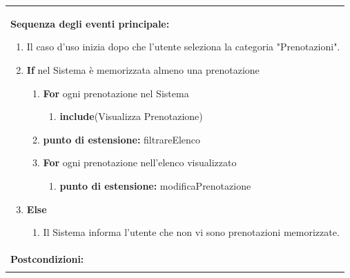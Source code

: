 \documentclass{article}
\begin{document}
\begin{table}[H]
\begin{tabular}{|p{\linewidth}|}
\begin{minipage}{\linewidth}
                        \end{minipage}
                        \vspace{0pt} \\
                        \hline
                        \textbf{Sequenza degli eventi principale:}
                        \begin{enumerate}
                            \item Il caso d'uso inizia dopo che l'utente seleziona la categoria "Prenotazioni".
                            \item \textbf{If} nel Sistema è memorizzata almeno una prenotazione
                            \begin{enumerate}
                                \item \textbf{For} ogni prenotazione nel Sistema
                                \begin{enumerate}
                                    \item \textbf{include}(Visualizza Prenotazione)
                                \end{enumerate}
                                \item[] \textbf{punto di estensione:} filtrareElenco
                                \item \textbf{For} ogni prenotazione nell'elenco visualizzato
                                \begin{enumerate}
                                    \item[] \textbf{punto di estensione:} modificaPrenotazione %
                                \end{enumerate}
                            \end{enumerate}
                            \item \textbf{Else}
                            \begin{enumerate}
                                \item Il Sistema informa l'utente che non vi sono prenotazioni memorizzate.
                            \end{enumerate}
                        \end{enumerate} \\
                        \hline
                        \cellcolor{gray!20}
                        \textbf{Postcondizioni:} \\
                        \cellcolor{gray!20}

\end{tabular}
\end{table}
\end{document}
